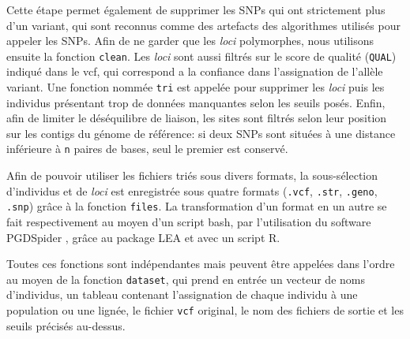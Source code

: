 Cette étape permet également de supprimer les SNPs qui ont strictement plus d'un variant, qui sont reconnus comme des artefacts des algorithmes utilisés pour appeler les SNPs.
Afin de ne garder que les \textit{loci} polymorphes, nous utilisons ensuite la fonction \verb|clean|. Les \textit{loci} sont aussi filtrés sur le score de qualité (\verb|QUAL|) indiqué dans le vcf, qui correspond a la confiance dans l'assignation de l'allèle variant.
 Une fonction nommée \verb|tri| est appelée pour supprimer les \textit{loci} puis les individus présentant trop de données manquantes selon les seuils posés. Enfin, afin de limiter le déséquilibre de liaison, les sites sont filtrés selon leur position sur les contigs du génome de référence: si deux SNPs sont situées à une distance inférieure à \verb|n| paires de bases, seul le premier est conservé.

Afin de pouvoir utiliser les fichiers triés sous divers formats, la sous-sélection d'individus et de \textit{loci} est enregistrée sous quatre formats (\verb|.vcf|, \verb|.str|, \verb|.geno|, \verb|.snp|) grâce à la fonction \verb|files|.
 La transformation d'un format en un autre se fait respectivement au moyen d'un script bash, par l'utilisation du software PGDSpider \citep{Lischer2012}, grâce au package LEA \citep{Frichot2015} et avec un script R.

Toutes ces fonctions sont indépendantes mais peuvent être appelées dans l'ordre au moyen de la fonction \verb|dataset|, qui prend en entrée un vecteur de noms d'individus, un tableau contenant l'assignation de chaque individu à une population ou une lignée, le fichier \verb|vcf| original, le nom des fichiers de sortie et les seuils précisés au-dessus.


